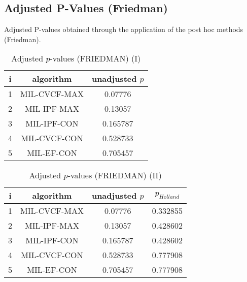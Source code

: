 \documentclass[a4paper,10pt]{article}
\begin{document}
\begin{landscape}
\newpage

\section{Adjusted P-Values (Friedman)}


Adjusted P-values obtained through the application of the post hoc methods (Friedman).

\begin{table}[!htp]
\centering\small
\begin{tabular}{ccc}
i&algorithm&unadjusted $p$\\
\hline1&MIL-CVCF-MAX&0.07776\\2&MIL-IPF-MAX&0.13057\\3&MIL-IPF-CON&0.165787\\4&MIL-CVCF-CON&0.528733\\5&MIL-EF-CON&0.705457\\\hline
\end{tabular}
\caption{Adjusted $p$-values (FRIEDMAN) (I)}
\end{table}
\begin{table}[!htp]
\centering\small
\begin{tabular}{cccc}
i&algorithm&unadjusted $p$&$p_{Holland}$\\
\hline1&MIL-CVCF-MAX&0.07776&0.332855\\2&MIL-IPF-MAX&0.13057&0.428602\\3&MIL-IPF-CON&0.165787&0.428602\\4&MIL-CVCF-CON&0.528733&0.777908\\5&MIL-EF-CON&0.705457&0.777908\\\hline
\end{tabular}
\caption{Adjusted $p$-values (FRIEDMAN) (II)}
\end{table}

\newpage
\end{landscape}
\end{document}
